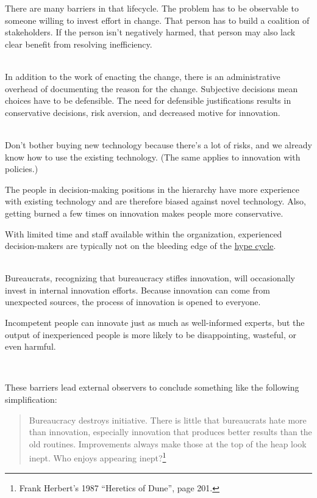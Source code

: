 There are many barriers in that lifecycle. The problem has to be observable to someone willing to invest effort in change. That person has to build a coalition of stakeholders. If the person isn't negatively harmed, that person may also lack clear benefit from resolving inefficiency. 

\ \\

In addition to the work of enacting the change, there is an administrative overhead of documenting the reason for the change. 
Subjective decisions mean choices have to be defensible. 
The need for defensible justifications results in conservative decisions, risk aversion, and decreased motive for innovation. 

\ \\

Don't bother buying new technology because there's a lot of risks, and we already know how to use the existing technology. (The same applies to innovation with policies.)

The people in decision-making positions in the hierarchy have more experience with existing technology and are therefore biased against novel technology. Also, getting burned a few times on innovation makes people more conservative.

With limited time and staff available within the organization, experienced decision-makers are typically not on the bleeding edge of the \href{https://en.wikipedia.org/wiki/Gartner_hype_cycle}{hype cycle}.

\ \\

Bureaucrats, recognizing that bureaucracy stifles innovation, will occasionally invest in internal innovation efforts. Because innovation can come from unexpected sources, the process of innovation is opened to everyone. 

Incompetent people can innovate just as much as well-informed experts, but the output of inexperienced people is more likely to be disappointing, wasteful, or even harmful. 

\ \\

\begin{samepage}
These barriers lead external observers to conclude something like the following simplification:
\begin{quote}
Bureaucracy destroys initiative. There is little that bureaucrats hate more than innovation, especially innovation that produces better results than the old routines.
Improvements always make those at the top of the heap look inept. Who enjoys appearing inept?\footnote{Frank Herbert's 1987 ``Heretics of Dune'', page 201.}%
\end{quote}
\end{samepage}
